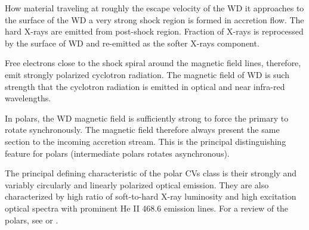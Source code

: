 \documentclass[oneside,a4paper,11pt]{report}
\begin{document}
How material traveling at roughly the escape velocity of the WD it approaches to the surface of the WD a very strong shock 
region is formed in accretion flow. The hard X-rays are emitted from post-shock region. Fraction of X-rays is reprocessed 
by the surface of WD and re-emitted as the softer X-rays component. 

Free electrons close to the shock spiral around the magnetic field lines, therefore, emit strongly polarized 
cyclotron radiation. The magnetic field of WD is such strength that the cyclotron radiation is emitted in optical and 
near infra-red wavelengths.               

In polars, the WD magnetic field is sufficiently strong to force the primary to rotate synchronously. The magnetic field 
therefore always present the same section to the incoming accretion stream. This is the principal distinguishing feature 
for polars (intermediate polars rotates asynchronous).   

The principal defining characteristic of the polar CVs class is their strongly and variably circularly 
and linearly polarized optical emission. They are also characterized by high ratio of soft-to-hard X-ray 
luminosity and high excitation optical spectra with prominent He II 468.6 emission lines. For a review of the polars, see \citet{1990SSRv...54..195C}
or \citet{warner:1}.  
\end{document}
